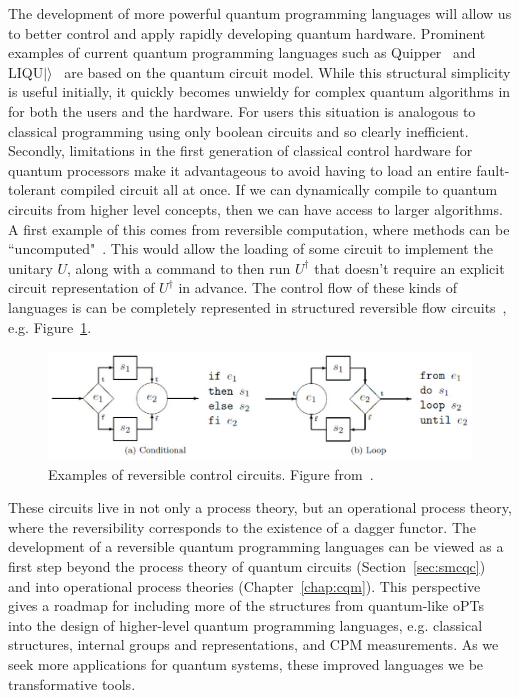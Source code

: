 The development of more powerful quantum programming languages will allow us to better control and apply rapidly developing quantum hardware. Prominent examples of current quantum programming languages such as Quipper~\cite{green2013quipper} and LIQU$|\rangle$~\cite{wecker2014liqui} are based on the quantum circuit model. While this structural simplicity is useful initially, it quickly becomes unwieldy for complex quantum algorithms in for both the users and the hardware. For users this situation is analogous to classical programming using only boolean circuits and so clearly inefficient. Secondly, limitations in the first generation of classical control hardware for quantum processors make it advantageous to avoid having to load an entire fault-tolerant compiled circuit all at once. If we can dynamically compile to quantum circuits from higher level concepts, then we can have access to larger algorithms. A first example of this comes from reversible computation, where methods can be ``uncomputed"~\cite{yokoyama2008principles}. This would allow the loading of some circuit to implement the unitary $U$, along with a command to then run $U^{\dagger}$ that doesn't require an explicit circuit representation of $U^{\dagger}$ in advance. The control flow of these kinds of languages is can be completely represented in structured reversible flow circuits~\cite{yokoyama2008reversible}, e.g. Figure~\ref{fig:reversible}.

\begin{figure}[ht]
\centering
\includegraphics[scale=0.45]{figures/reversible.eps}
\caption[Example of reversible control circuits.]{Examples of reversible control circuits.  Figure from~\cite{yokoyama2010reversible}.}
\label{fig:reversible}
\end{figure}

These circuits live in not only a process theory, but an operational process theory, where the reversibility corresponds to the existence of a dagger functor. The development of a reversible quantum programming languages can be viewed as a first step beyond the process theory of quantum circuits (Section~\ref{sec:smcqc}) and into operational process theories (Chapter~\ref{chap:cqm}). This perspective gives a roadmap for including more of the structures from quantum-like oPTs into the design of higher-level quantum programming languages, e.g. classical structures, internal groups and representations, and CPM measurements. As we seek more applications for quantum systems, these improved languages we be transformative tools.

